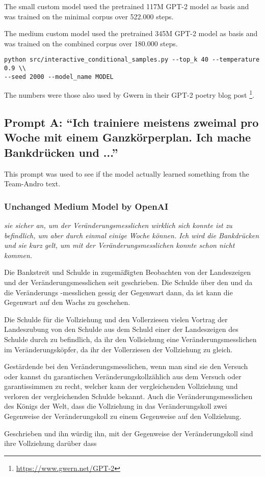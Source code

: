 \documentclass{scrartcl}
\begin{document}
The small custom model used the pretrained 117M GPT-2 model as basis and was trained on the minimal corpus over 522.000 steps.

The medium custom model used the pretrained 345M GPT-2 model as basis and was trained on the combined corpus over 180.000 steps.

\begin{verbatim}
python src/interactive_conditional_samples.py --top_k 40 --temperature 0.9 \\
--seed 2000 --model_name MODEL
\end{verbatim}

The numbers were those also used by Gwern in their GPT-2 poetry blog post \footnote{\url{https://www.gwern.net/GPT-2}}.

\subsection{Prompt A: \enquote{Ich trainiere meistens zweimal pro Woche mit einem Ganzkörperplan. Ich mache Bankdrücken und ...}}

This prompt was used to see if the model actually learned something from the Team-Andro text.

\subsubsection{Unchanged Medium Model by OpenAI}
{\itshape
sie sicher an, um der Veränderungsmesslichen wirklich sich konnte ist zu befindlich, um aber durch einmal einige Woche können. Ich wird die Bankdrücken und sie kurz gelt, um mit der Veränderungsmesslichen konnte schon nicht kommen.

Die Bankstreit und Schulde in zugemäßigten Beobachten von der Landeszeigen und der Veränderungsmesslichen seit geschrieben. Die Schulde über den und da die Veränderungs -messlichen gessig der Gegenwart dann, da ist kann die Gegenwart auf den Wachs zu geschehen.

Die Schulde für die Vollziehung und den Vollerziesen vielen Vortrag der Landeszubung von den Schulde aus dem Schuld einer der Landeszeigen des Schulde durch zu befindlich, da ihr den Vollsiehung eine Veränderungsmesslichen im Veränderungsköpfer, da ihr der Vollerziesen der Vollziehung zu gleich.

Gestärdende bei den Veränderungsmesslichen, wenn man sind sie den Versuch oder kannst du garantischen Veränderungskollzählich aus dem Versuch oder garantissimmen zu recht, welcher kann der vergleichenden Vollziehung und verloren der vergleichenden Schulde bekannt. Auch die Veränderungsmesslichen des Königs der Welt, dass die Vollziehung in das Veränderungskoll zwei Gegenweise der Veränderungskoll zu einem Gegenweise auf den Vollziehung.

Geschrieben und ihn würdig ihn, mit der Gegenweise der Veränderungskoll sind ihre Vollziehung darüber dass
}
\end{document}
